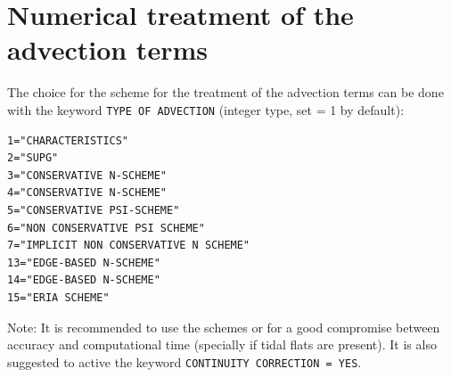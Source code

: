 \section{Numerical treatment of the advection terms}
The choice for the scheme for the treatment of the advection terms can be done with the keyword \texttt{TYPE OF ADVECTION} (integer type, set {\ttfamily = 1} by default):
\begin{lstlisting}[frame=trBL]
1="CHARACTERISTICS"
2="SUPG"
3="CONSERVATIVE N-SCHEME"
4="CONSERVATIVE N-SCHEME"
5="CONSERVATIVE PSI-SCHEME"
6="NON CONSERVATIVE PSI SCHEME"
7="IMPLICIT NON CONSERVATIVE N SCHEME"
13="EDGE-BASED N-SCHEME"
14="EDGE-BASED N-SCHEME"
15="ERIA SCHEME"
\end{lstlisting}

\begin{WarningBlock}{Note:}
  It is recommended to use the schemes {} or {} for a good compromise between accuracy and computational time (specially if tidal flats are present). It is also suggested to active
  the keyword \texttt{CONTINUITY CORRECTION = YES}.
\end{WarningBlock}

